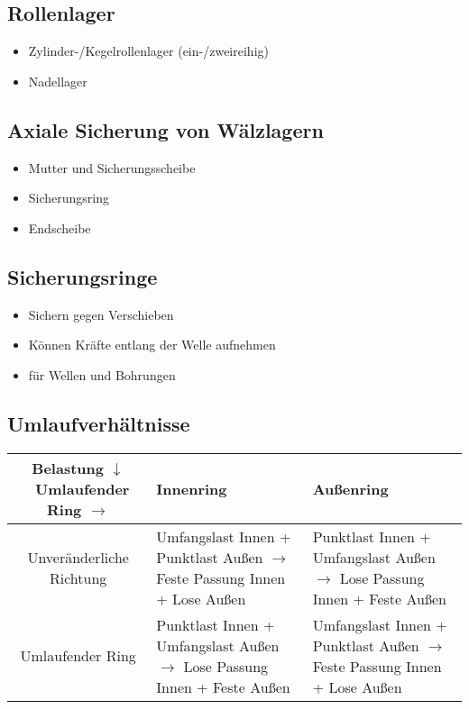 \documentclass[a4paper,parskip=half*,DIV=7,fontsize=11pt]{scrartcl}
\begin{document}
\subsection{Rollenlager}
\begin{itemize}
	\item Zylinder-/Kegelrollenlager (ein-/zweireihig)
	\item Nadellager		
\end{itemize}
	
\subsection{Axiale Sicherung von Wälzlagern}
\begin{itemize}
	\item Mutter und Sicherungsscheibe
	\item Sicherungsring
	\item Endscheibe
\end{itemize}
	
\subsection{Sicherungsringe}
\begin{itemize}
	\item Sichern gegen Verschieben
	\item Können Kräfte entlang der Welle aufnehmen
	\item für Wellen und Bohrungen 
\end{itemize}
	
\subsection{Umlaufverhältnisse}
\begin{tabular}{|c|p{5cm}|p{5cm}|}
	\hline
	Belastung $\downarrow$ \ Umlaufender Ring $\rightarrow$ & Innenring                                                                              & Außenring                                                                             \\
	\hline
	Unveränderliche Richtung                               & Umfangslast Innen + Punktlast Außen  $\rightarrow$  Feste Passung Innen + Lose Außen & Punktlast Innen + Umfangslast Außen  $\rightarrow$  Lose Passung Innen + Feste Außen \\
	\hline
	Umlaufender Ring                                        & Punktlast Innen + Umfangslast Außen  $\rightarrow$ Lose Passung Innen + Feste Außen  & Umfangslast Innen + Punktlast Außen  $\rightarrow$ Feste Passung Innen + Lose Außen  \\
	\hline
\end{tabular}
	
\end{document}
